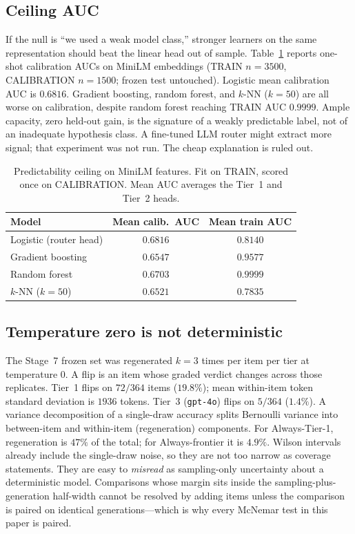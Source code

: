 \documentclass[a4paper,twoside]{article}
\begin{document}
\subsection{Ceiling AUC}

If the null is ``we used a weak model class,'' stronger learners on the same representation should beat the linear head out of sample. Table~\ref{tab:ceiling} reports one-shot calibration AUCs on MiniLM embeddings (TRAIN $n=3500$, CALIBRATION $n=1500$; frozen test untouched). Logistic mean calibration AUC is $0.6816$. Gradient boosting, random forest, and $k$-NN ($k=50$) are all worse on calibration, despite random forest reaching TRAIN AUC $0.9999$. Ample capacity, zero held-out gain, is the signature of a weakly predictable label, not of an inadequate hypothesis class. A fine-tuned LLM router might extract more signal; that experiment was not run. The cheap explanation is ruled out.

\begin{table}[t]
\centering
\caption{Predictability ceiling on MiniLM features. Fit on TRAIN, scored once on CALIBRATION. Mean AUC averages the Tier~1 and Tier~2 heads.}
\label{tab:ceiling}
\scriptsize
\begin{tabular}{@{}l cc@{}}
\toprule
Model & Mean calib.\ AUC & Mean train AUC \\
\midrule
Logistic (router head) & $\mathbf{0.6816}$ & $0.8140$ \\
Gradient boosting & $0.6547$ & $0.9577$ \\
Random forest & $0.6703$ & $0.9999$ \\
$k$-NN ($k=50$) & $0.6521$ & $0.7835$ \\
\bottomrule
\end{tabular}
\end{table}

\subsection{Temperature zero is not deterministic}

The Stage~7 frozen set was regenerated $k=3$ times per item per tier at temperature $0$. A flip is an item whose graded verdict changes across those replicates. Tier~1 flips on $72/364$ items ($19.8\%$); mean within-item token standard deviation is $1936$ tokens. Tier~3 (\texttt{gpt-4o}) flips on $5/364$ ($1.4\%$). A variance decomposition of a single-draw accuracy splits Bernoulli variance into between-item and within-item (regeneration) components. For Always-Tier-1, regeneration is $47\%$ of the total; for Always-frontier it is $4.9\%$. Wilson intervals already include the single-draw noise, so they are not too narrow as coverage statements. They are easy to \emph{misread} as sampling-only uncertainty about a deterministic model. Comparisons whose margin sits inside the sampling-plus-generation half-width cannot be resolved by adding items unless the comparison is paired on identical generations---which is why every McNemar test in this paper is paired.
\end{document}
